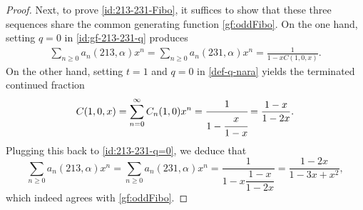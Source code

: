 \documentclass[12pt]{amsart}
\numberwithin{equation}{section}
\theoremstyle{plain}
\begin{document}
\begin{proof}
Next, to prove \eqref{id:213-231-Fibo}, it suffices to show that these three sequences share the common generating function \eqref{gf:oddFibo}. On the one hand, setting $q=0$ in \eqref{id:gf-213-231-q} produces
\begin{align}\label{id:213-231-q=0}
\sum_{n\ge 0}a_n(213,\alpha)x^n=\sum_{n\ge 0}a_n(231,\alpha)x^n=\frac{1}{1-xC(1,0,x)}.
\end{align} 
On the other hand, setting $t=1$ and $q=0$ in \eqref{def-q-nara} yields the terminated continued fraction
\begin{align*}
C(1,0,x)=\sum_{n=0}^{\infty} C_n(1,0)x^n=\cfrac{1}{1-\cfrac{x}{1-x}}=\frac{1-x}{1-2x}.
\end{align*}
Plugging this back to \eqref{id:213-231-q=0}, we deduce that
$$\sum_{n\ge 0}a_n(213,\alpha)x^n=\sum_{n\ge 0}a_n(231,\alpha)x^n=\dfrac{1}{1-x\dfrac{1-x}{1-2x}}=\frac{1-2x}{1-3x+x^2},$$
which indeed agrees with \eqref{gf:oddFibo}.
\end{proof}
\end{document}
